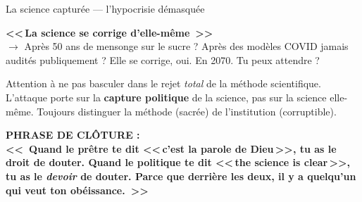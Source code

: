 \documentclass[a4paper,11pt]{article}
\newcommand{\phraseforte}[1]{\textbf{\textcolor{ModeRouge}{<<~#1~>>}}}
\begin{document}
\begin{ficherouge}{La science captur\'{e}e --- l'hypocrisie d\'{e}masqu\'{e}e}
\begin{contrearg}
\textbf{<<\,La science se corrige d'elle-m\^{e}me~>>}\\
$\rightarrow$ Apr\`{e}s 50 ans de mensonge sur le sucre ? Apr\`{e}s des mod\`{e}les COVID jamais audit\'{e}s publiquement ? Elle se corrige, oui. En 2070. Tu peux attendre ?
\end{contrearg}

\begin{anglemort}
Attention \`{a} ne pas basculer dans le rejet \emph{total} de la m\'{e}thode scientifique. L'attaque porte sur la \textbf{capture politique} de la science, pas sur la science elle-m\^{e}me. Toujours distinguer la m\'{e}thode (sacr\'{e}e) de l'institution (corruptible).
\end{anglemort}

\vspace{0.3cm}
\textbf{\color{ModeRouge}PHRASE DE CL\^{O}TURE :}\\
\phraseforte{Quand le pr\^{e}tre te dit <<\,c'est la parole de Dieu\,>>, tu as le droit de douter. Quand le politique te dit <<\,the science is clear\,>>, tu as le \emph{devoir} de douter. Parce que derri\`{e}re les deux, il y a quelqu'un qui veut ton ob\'{e}issance.}

\end{ficherouge}

\newpage

\end{document}
